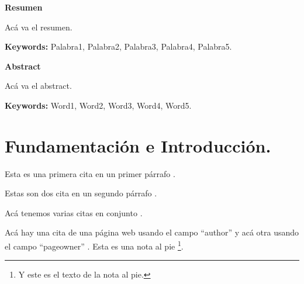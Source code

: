 

\pagestyle{fancy}
\fancyhead{}
\fancyfoot{}
\fancyfoot[R]{\thepage}

\tableofcontents %
\newpage %

\begin{flushleft} 
	\fontsize{14pt}{17pt}\selectfont
	\textbf{Resumen}
\end{flushleft}

Acá va el resumen.\par

\begin{footnotesize}
	\textbf{Keywords:} Palabra1, Palabra2, Palabra3, Palabra4, Palabra5.
\end{footnotesize}

\begin{flushleft} 
	\fontsize{14pt}{17pt}\selectfont
	\textbf{Abstract}
\end{flushleft}

Acá va el  abstract.\par

\begin{footnotesize}
	\textbf{Keywords:} Word1, Word2, Word3, Word4, Word5.
\end{footnotesize}


\newpage


\section{Fundamentación e Introducción.}
Esta es una primera cita en un primer párrafo \cite{Repp2005}.\par
Estas son dos cita en un segundo párrafo \cite{Grootswager2020, Geronazzo2014}.\par
Acá tenemos varias citas en conjunto \cite{Gallant2019, Bridges2020, Anwyl2020, Pronk2020}. \par
Acá hay una cita de una página web usando el campo “author” \cite{Warusfel2002} y acá otra usando el campo “pageowner” \cite{KEMAR}.
Esta es una nota al pie \footnote{Y este es el texto de la nota al pie.}.

